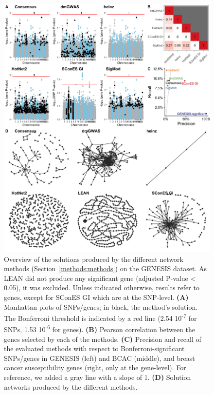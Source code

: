 \documentclass[twocolumn, 11pt]{article}
\begin{document}
\begin{figure}[htbp]
  \centering
  \includegraphics[height=.75\textheight]{./figures/figure_1.png}
  \caption{\label{fig:solution_overview} Overview of the solutions produced by the different network methods (Section~\ref{methods:methods}) on the GENESIS dataset. As LEAN did not produce any significant gene (adjusted P-value < 0.05), it was excluded. Unless indicated otherwise, results refer to genes, except for SConES GI which are at the SNP-level. \textbf{(A)} Manhattan plots of SNPs/genes; in black, the method's solution. The Bonferroni threshold is indicated by a red line (2.54 \texttimes{} 10\textsuperscript{-7} for SNPs, 1.53 \texttimes{} 10\textsuperscript{-6} for genes). \textbf{(B)} Pearson correlation between the genes selected by each of the methods. \textbf{(C)} Precision and recall of the evaluated methods with respect to Bonferroni-significant SNPs/genes in GENESIS (left) and BCAC (middle), and breast cancer susceptibility genes (right, only at the gene-level). For reference, we added a gray line with a slope of 1. \textbf{(D)} Solution networks produced by the different methods.}
\end{figure}
\end{document}
